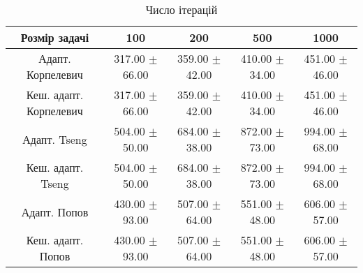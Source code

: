 \begin{table}[H]
	\centering
	\begin{tabular}{|c||c|c|c|c|}\hline
		Розмір задачі & 100 & 200 & 500 & 1000 \\ \hline \hline
		Адапт. Корпелевич & 317.00 $\pm$ 66.00 & 359.00 $\pm$ 42.00 & 410.00 $\pm$ 34.00 & 451.00 $\pm$ 46.00 \\ \hline
		Кеш. адапт. Корпелевич & 317.00 $\pm$ 66.00 & 359.00 $\pm$ 42.00 & 410.00 $\pm$ 34.00 & 451.00 $\pm$ 46.00 \\ \hline
		Адапт. Tseng & 504.00 $\pm$ 50.00 & 684.00 $\pm$ 38.00 & 872.00 $\pm$ 73.00 & 994.00 $\pm$ 68.00 \\ \hline
		Кеш. адапт. Tseng & 504.00 $\pm$ 50.00 & 684.00 $\pm$ 38.00 & 872.00 $\pm$ 73.00 & 994.00 $\pm$ 68.00 \\ \hline
		Адапт. Попов & 430.00 $\pm$ 93.00 & 507.00 $\pm$ 64.00 & 551.00 $\pm$ 48.00 & 606.00 $\pm$ 57.00 \\ \hline
		Кеш. адапт. Попов & 430.00 $\pm$ 93.00 & 507.00 $\pm$ 64.00 & 551.00 $\pm$ 48.00 & 606.00 $\pm$ 57.00 \\ \hline
	\end{tabular}
	\caption{Число ітерацій}
\end{table}
